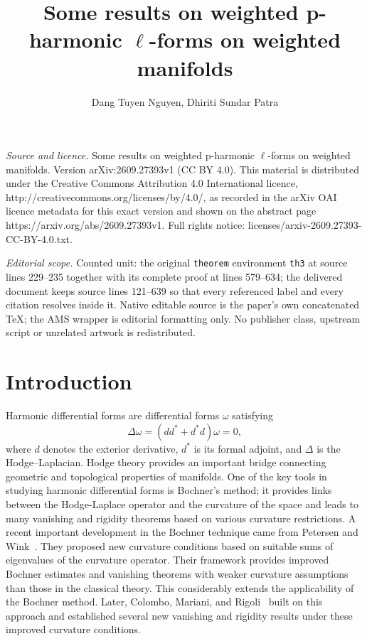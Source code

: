 \documentclass[10pt,a4paper]{amsart}
\numberwithin{equation}{section}
\begin{document}
\title[Some results on weighted p-harmonic ell-forms on weighted ma]{Some results on weighted p-harmonic $\ell$-forms on weighted manifolds}
\author{Dang Tuyen Nguyen, Dhiriti Sundar Patra}
\date{}
\maketitle
\noindent\emph{Source and licence.} Some results on weighted p-harmonic $\ell$-forms on weighted manifolds. Version arXiv:2609.27393v1 (CC BY 4.0). This material is distributed under the Creative Commons Attribution 4.0 International licence, http://creativecommons.org/licenses/by/4.0/, as recorded in the arXiv OAI licence metadata for this exact version and shown on the abstract page https://arxiv.org/abs/2609.27393v1. Full rights notice: licenses/arxiv-2609.27393-CC-BY-4.0.txt.\par\smallskip
\noindent\textit{Editorial scope.} Counted unit: the original \texttt{theorem} environment \texttt{th3} at source lines 229--235 together with its complete proof at lines 579--634; the delivered document keeps source lines 121--639 so that every referenced label and every citation resolves inside it. Native editable source is the paper's own concatenated TeX; the AMS wrapper is editorial formatting only. No publisher class, upstream script or unrelated artwork is redistributed.
\section{Introduction}


Harmonic differential forms are differential forms $\omega$ satisfying
\[
\Delta\omega=(dd^{*}+d^{*}d)\omega=0,
\]
where $d$ denotes the exterior derivative, $d^{*}$ is its formal adjoint, and $\Delta$ is the Hodge--Laplacian. Hodge theory provides an important bridge connecting geometric and topological properties of manifolds. One of the key tools in studying harmonic differential forms is Bochner’s method; it provides links between the Hodge-Laplace operator and the curvature of the space and leads to many vanishing and rigidity theorems based on various curvature restrictions.
A recent important development in the Bochner technique came from Petersen and Wink~\cite{PW20,PW21,PW22}. They proposed new curvature conditions based on suitable sums of eigenvalues of the curvature operator. Their framework provides improved Bochner estimates and vanishing theorems with weaker curvature assumptions than those in the classical theory. This considerably extends the applicability of the Bochner method.  Later, Colombo, Mariani, and Rigoli~\cite{CMR24} built on this approach and established several new vanishing and rigidity results under these improved curvature conditions.
\end{document}

